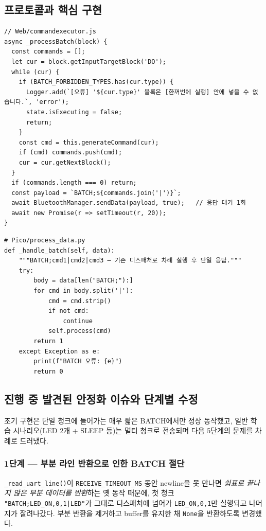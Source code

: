 \documentclass[11pt, oneside]{article}
\begin{document}
\subsection{프로토콜과 핵심 구현}

\begin{verbatim}
// Web/commandexecutor.js
async _processBatch(block) {
  const commands = [];
  let cur = block.getInputTargetBlock('DO');
  while (cur) {
    if (BATCH_FORBIDDEN_TYPES.has(cur.type)) {
      Logger.add(`[오류] '${cur.type}' 블록은 [한꺼번에 실행] 안에 넣을 수 없습니다.`, 'error');
      state.isExecuting = false;
      return;
    }
    const cmd = this.generateCommand(cur);
    if (cmd) commands.push(cmd);
    cur = cur.getNextBlock();
  }
  if (commands.length === 0) return;
  const payload = `BATCH;${commands.join('|')}`;
  await BluetoothManager.sendData(payload, true);   // 응답 대기 1회
  await new Promise(r => setTimeout(r, 20));
}
\end{verbatim}

\begin{verbatim}
# Pico/process_data.py
def _handle_batch(self, data):
    """BATCH;cmd1|cmd2|cmd3 — 기존 디스패처로 차례 실행 후 단일 응답."""
    try:
        body = data[len("BATCH;"):]
        for cmd in body.split('|'):
            cmd = cmd.strip()
            if not cmd:
                continue
            self.process(cmd)
        return 1
    except Exception as e:
        print(f"BATCH 오류: {e}")
        return 0
\end{verbatim}

\subsection{진행 중 발견된 안정화 이슈와 단계별 수정}

초기 구현은 단일 청크에 들어가는 매우 짧은 BATCH에서만 정상 동작했고,
일반 학습 시나리오(LED 2개 + SLEEP 등)는 멀티 청크로 전송되며 다음 5단계의
문제를 차례로 드러냈다.

\subsubsection*{1단계 --- 부분 라인 반환으로 인한 BATCH 절단}

\texttt{\_read\_uart\_line()}이 \texttt{RECEIVE\_TIMEOUT\_MS} 동안 newline을
못 만나면 \emph{쉼표로 끝나지 않은 부분 데이터를 반환}하는 옛 동작 때문에,
첫 청크 \texttt{"BATCH;LED\_ON,0,1|LED"}가 그대로 디스패처에 넘어가
\texttt{LED\_ON,0,1}만 실행되고 나머지가 잘려나갔다. 부분 반환을 제거하고
buffer를 유지한 채 \texttt{None}을 반환하도록 변경했다.
\end{document}
